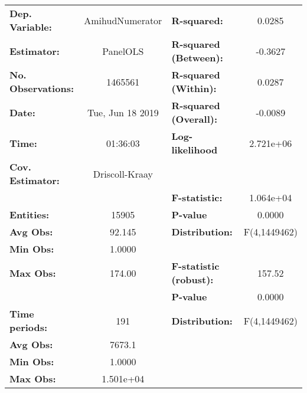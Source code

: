 \begin{center}
\begin{tabular}{lclc}
\toprule
\textbf{Dep. Variable:}                 &  AmihudNumerator   & \textbf{  R-squared:         }   &      0.0285      \\
\textbf{Estimator:}                     &      PanelOLS      & \textbf{  R-squared (Between):}  &     -0.3627      \\
\textbf{No. Observations:}              &      1465561       & \textbf{  R-squared (Within):}   &      0.0287      \\
\textbf{Date:}                          &  Tue, Jun 18 2019  & \textbf{  R-squared (Overall):}  &     -0.0089      \\
\textbf{Time:}                          &      01:36:03      & \textbf{  Log-likelihood     }   &    2.721e+06     \\
\textbf{Cov. Estimator:}                &   Driscoll-Kraay   & \textbf{                     }   &                  \\
\textbf{}                               &                    & \textbf{  F-statistic:       }   &    1.064e+04     \\
\textbf{Entities:}                      &       15905        & \textbf{  P-value            }   &      0.0000      \\
\textbf{Avg Obs:}                       &       92.145       & \textbf{  Distribution:      }   &   F(4,1449462)   \\
\textbf{Min Obs:}                       &       1.0000       & \textbf{                     }   &                  \\
\textbf{Max Obs:}                       &       174.00       & \textbf{  F-statistic (robust):} &      157.52      \\
\textbf{}                               &                    & \textbf{  P-value            }   &      0.0000      \\
\textbf{Time periods:}                  &        191         & \textbf{  Distribution:      }   &   F(4,1449462)   \\
\textbf{Avg Obs:}                       &       7673.1       & \textbf{                     }   &                  \\
\textbf{Min Obs:}                       &       1.0000       & \textbf{                     }   &                  \\
\textbf{Max Obs:}                       &     1.501e+04      & \textbf{                     }   &                  \\

\end{tabular}
\end{center}

